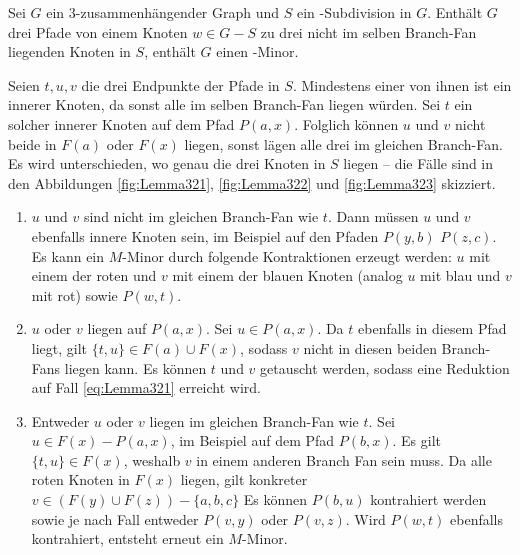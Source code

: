 \begin{lemma}\label{eq:Lemma32}
  Sei $G$ ein $3$-zusammenhängender Graph und $S$ ein \kdd-Subdivision in $G$.
  Enthält $G$ drei Pfade von einem Knoten $w \in G - S$ zu drei nicht im selben Branch-Fan liegenden Knoten in $S$, enthält $G$ einen \kf-Minor.
  \cite{KeM92}
\end{lemma}
\begin{beweis}
  Seien $t, u, v$ die drei Endpunkte der Pfade in $S$.
  Mindestens einer von ihnen ist ein innerer Knoten, da sonst alle im selben Branch-Fan liegen würden.
  Sei \oBdA $t$ ein solcher innerer Knoten auf dem Pfad $P(a, x)$.
  Folglich können $u$ und $v$ nicht beide in $F(a)$ oder $F(x)$ liegen, sonst lägen alle drei im gleichen Branch-Fan.
  Es wird unterschieden, wo genau die drei Knoten in $S$ liegen -- die Fälle sind in den Abbildungen \ref{fig:Lemma321}, \ref{fig:Lemma322} und \ref{fig:Lemma323} skizziert.
  \begin{enumerate}
    \item $u$ und $v$ sind nicht im gleichen Branch-Fan wie $t$. \label{eq:Lemma321}
          Dann müssen $u$ und $v$ ebenfalls innere Knoten sein, im Beispiel auf den Pfaden $P(y, b)$ \bzw $P(z, c)$.
          Es kann ein $M$-Minor durch folgende Kontraktionen erzeugt werden: $u$ mit einem der roten und $v$ mit einem der blauen Knoten (analog $u$ mit blau und $v$ mit rot) sowie $P(w, t)$.
    \item $u$ oder $v$ liegen auf $P(a, x)$. \label{eq:Lemma322}
          Sei \oBdA $u \in P(a, x)$.
          Da $t$ ebenfalls in diesem Pfad liegt, gilt $\{t, u\} \in F(a) \cup F(x)$, sodass $v$ nicht in diesen beiden Branch-Fans liegen kann.
          Es können $t$ und $v$ getauscht werden, sodass eine Reduktion auf Fall \ref{eq:Lemma321} erreicht wird.
    \item Entweder $u$ oder $v$ liegen im gleichen Branch-Fan wie $t$. \label{eq:Lemma323}
          Sei \oBdA $u \in F(x) - P(a, x)$, im Beispiel auf dem Pfad $P(b, x)$.
          Es gilt $\{t, u\} \in F(x)$, weshalb $v$ in einem anderen Branch Fan sein muss.
          Da alle roten Knoten in $F(x)$ liegen, gilt konkreter $v \in (F(y) \cup F(z)) - \{a, b, c\}$
          Es können $P(b, u)$ kontrahiert werden sowie je nach Fall entweder $P(v, y)$ oder $P(v, z)$.
          Wird $P(w, t)$ ebenfalls kontrahiert, entsteht erneut ein $M$-Minor.
  \end{enumerate}
  \cite{KeM92}
\end{beweis}
